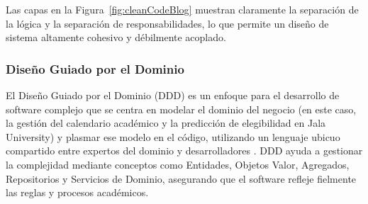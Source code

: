Las capas en la Figura~\ref{fig:cleanCodeBlog} muestran claramente la separación de la lógica y la separación de responsabilidades, lo que permite un diseño de sistema altamente cohesivo y débilmente acoplado.


\subsubsection{Diseño Guiado por el Dominio}
El Diseño Guiado por el Dominio (DDD) es un enfoque para el desarrollo de software complejo que se centra en modelar el dominio del negocio (en este caso, la gestión del calendario académico y la predicción de elegibilidad en Jala University) y plasmar ese modelo en el código, utilizando un lenguaje ubicuo compartido entre expertos del dominio y desarrolladores \parencite{Evans2003}.
DDD ayuda a gestionar la complejidad mediante conceptos como Entidades, Objetos Valor, Agregados, Repositorios y Servicios de Dominio, asegurando que el software refleje fielmente las reglas y procesos académicos.
